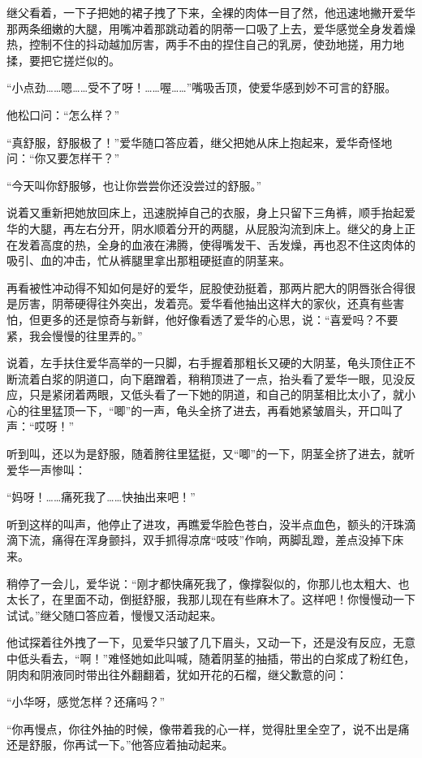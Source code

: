 \documentclass[12pt,UTF8]{ctexbook}
\begin{document}
继父看着，一下子把她的裙子拽了下来，全裸的肉体一目了然，他迅速地撇开爱华那两条细嫩的大腿，用嘴冲着那跳动着的阴蒂一口吸了上去，爱华感觉全身发着燥热，控制不住的抖动越加厉害，两手不由的捏住自己的乳房，使劲地搓，用力地揉，要把它搓烂似的。

“小点劲……嗯……受不了呀！……喔……”嘴吸舌顶，使爱华感到妙不可言的舒服。

他松口问：“怎么样？”

“真舒服，舒服极了！”爱华随口答应着，继父把她从床上抱起来，爱华奇怪地问：“你又要怎样干？”

“今天叫你舒服够，也让你尝尝你还没尝过的舒服。”

说着又重新把她放回床上，迅速脱掉自己的衣服，身上只留下三角裤，顺手抬起爱华的大腿，再左右分开，阴水顺着分开的两腿，从屁股沟流到床上。继父的身上正在发着高度的热，全身的血液在沸腾，使得嘴发干、舌发燥，再也忍不住这肉体的吸引、血的冲击，忙从裤腿里拿出那粗硬挺直的阴茎来。

再看被性冲动得不知如何是好的爱华，屁股使劲挺着，那两片肥大的阴唇张合得很是厉害，阴蒂硬得往外突出，发着亮。爱华看他抽出这样大的家伙，还真有些害怕，但更多的还是惊奇与新鲜，他好像看透了爱华的心思，说：“喜爱吗？不要紧，我会慢慢的往里弄的。”

说着，左手扶住爱华高举的一只脚，右手握着那粗长又硬的大阴茎，龟头顶住正不断流着白浆的阴道口，向下磨蹭着，稍稍顶进了一点，抬头看了爱华一眼，见没反应，只是紧闭着两眼，又低头看了一下她的阴道，和自己的阴茎相比太小了，就小心的往里猛顶一下，“唧”的一声，龟头全挤了进去，再看她紧皱眉头，开口叫了声：“哎呀！”

听到叫，还以为是舒服，随着胯往里猛挺，又“唧”的一下，阴茎全挤了进去，就听爱华一声惨叫：

“妈呀！……痛死我了……快抽出来吧！”

听到这样的叫声，他停止了进攻，再瞧爱华脸色苍白，没半点血色，额头的汗珠滴滴下流，痛得在浑身颤抖，双手抓得凉席“吱吱”作响，两脚乱蹬，差点没掉下床来。

稍停了一会儿，爱华说：“刚才都快痛死我了，像撑裂似的，你那儿也太粗大、也太长了，在里面不动，倒挺舒服，我那儿现在有些麻木了。这样吧！你慢慢动一下试试。”继父随口答应着，慢慢又活动起来。

他试探着往外拽了一下，见爱华只皱了几下眉头，又动一下，还是没有反应，无意中低头看去，“啊！”难怪她如此叫喊，随着阴茎的抽插，带出的白浆成了粉红色，阴肉和阴液同时带出往外翻翻着，犹如开花的石榴，继父歉意的问：

“小华呀，感觉怎样？还痛吗？”

“你再慢点，你往外抽的时候，像带着我的心一样，觉得肚里全空了，说不出是痛还是舒服，你再试一下。”他答应着抽动起来。
\end{document}
